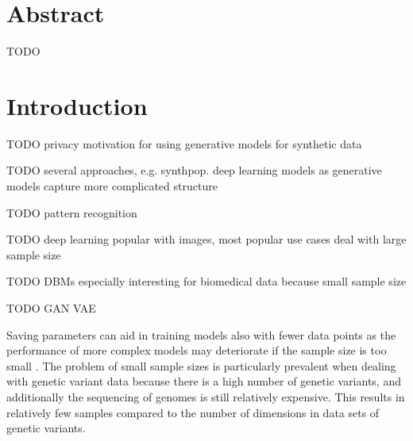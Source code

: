 \documentclass[12pt]{article}
\begin{document}



\tableofcontents
\newpage
\onehalfspacing

\section*{Abstract}
TODO

\clearpage
\section{Introduction}
TODO privacy motivation for using generative models for synthetic data

TODO several approaches, e.g. synthpop. deep learning models as generative models capture more complicated structure

TODO pattern recognition

TODO deep learning popular with images, most popular use cases deal with large sample size

TODO DBMs especially interesting for biomedical data because small sample size

TODO GAN VAE

Saving parameters can aid in training models also with fewer data points as the performance of more complex models may deteriorate if the sample size is too small \citep{chan_classifier_1999}.
The problem of small sample sizes is particularly prevalent when dealing with genetic variant data 
because there is a high number of genetic variants, and additionally the sequencing of genomes is still relatively expensive.
This results in relatively few samples compared to the number of dimensions in data sets of genetic variants.
\end{document}
